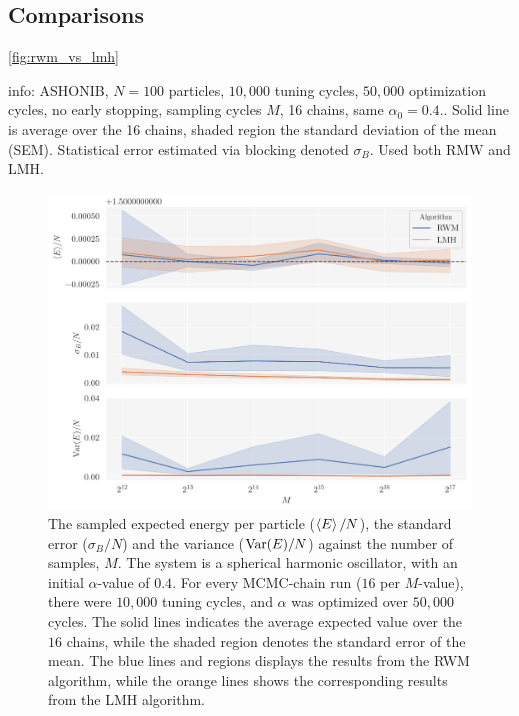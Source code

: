 \FloatBarrier

\subsection{Comparisons}

\autoref{fig:rwm_vs_lmh} 

info: ASHONIB, $N=100$ particles, $10,000$ tuning cycles, $50,000$ optimization cycles, no early stopping, sampling cycles $M$, 16 chains, same $\alpha_0 = 0.4.$. Solid line is average over the 16 chains, shaded region the standard deviation of the mean (SEM). Statistical error estimated via blocking denoted $\sigma_B$. Used both RMW and LMH.

\begin{figure}[!htb]
\begin{center}\includegraphics[width=\textwidth]{latex/figures/ashonib_N100_rwm_vs_lmh.pdf}
\end{center}
\caption{The sampled expected energy per particle ($\expval{E}/N$), the standard error ($\sigma_B/N$) and the variance ($\mathrm{Var}\qty(E)/N$) against the number of samples, $M$. The system is a spherical harmonic oscillator, with an initial $\alpha$-value of $0.4$. For every MCMC-chain run ($16$ per $M$-value), there were $10,000$ tuning cycles, and $\alpha$ was optimized over $50,000$ cycles. The solid lines indicates the average expected value over the $16$ chains, while the shaded region denotes the standard error of the mean. The blue lines and regions displays the results from the RWM algorithm, while the orange lines shows the corresponding results from the LMH algorithm.}
\label{fig:rwm_vs_lmh}
\end{figure}


